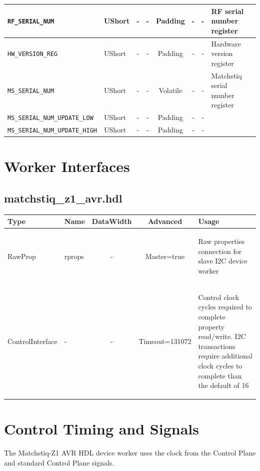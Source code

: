\documentclass{article}
\def\comp{matchstiq\_z1\_avr}
\def\Comp{Matchstiq-Z1 AVR}
\begin{document}
\begin{landscape}
\begin{scriptsize}
\begin{tabular}{|p{4cm}|p{1cm}|c|c|c|c|c|p{7cm}|}
			\hline
			\verb+RF_SERIAL_NUM+            & UShort  & - & -  & Padding  & -        & -        & RF serial number register \\
			\hline
			\verb+HW_VERSION_REG+           & UShort  & - & -  & Padding  & -        & -        & Hardware version register \\
			\hline
			\verb+MS_SERIAL_NUM+            & UShort  & - & -  & Volatile & -        & -        & Matchstiq serial number register \\
			\hline
			\verb+MS_SERIAL_NUM_UPDATE_LOW+ & UShort  & - & -  & Padding  & -        & -        & \\
			\hline
			\verb+MS_SERIAL_NUM_UPDATE_HIGH+& UShort  & - & -  & Padding  & -        & -        & \\
			\hline
		\end{tabular}
	\end{scriptsize}
	\section*{Worker Interfaces}
	\subsection*{\comp.hdl}
	\begin{scriptsize}
		\begin{tabular}{|M{2cm}|M{1.5cm}|c|c|M{12cm}|}
			\hline
			Type & Name & DataWidth & Advanced & Usage \\
			\hline
			RawProp
			& rprops
			& -
			& Master=true
			& \begin{flushleft}Raw properties connection for slave I2C device worker\end{flushleft}\\
			\hline
			ControlInterface
			& -
			& -
			& Timeout=131072
			& \begin{flushleft}Control clock cycles required to complete property  read/write. I2C transactions require additional clock cycles to complete than the default of 16 \end{flushleft}\\
			\hline
		\end{tabular}
	\end{scriptsize}
\end{landscape}

\section*{Control Timing and Signals}
The \Comp{} HDL device worker uses the clock from the Control Plane and standard Control Plane signals.
\end{document}

